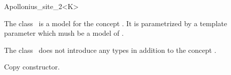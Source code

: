 

\begin{ccRefClass}{Apollonius_site_2<K>}  %


\ccDefinition
  
The class \ccRefName\ is a model for the concept
. It is parametrized by a template parameter
 which mush be a model of .


\ccIsModel
{}

\ccTypes

The class \ccRefName\ does not introduce any types in addition to the
concept .


\ccCreation
{}  %
\ccGlue
{}
{Copy constructor.}



\ccSeeAlso
{}\\


\end{ccRefClass}


